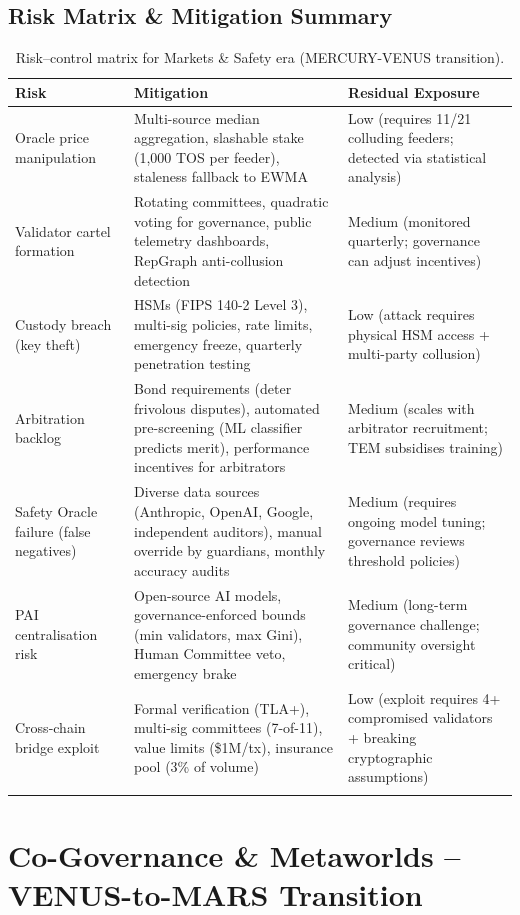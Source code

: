 \documentclass[11pt]{article}
\begin{document}
\subsection{Risk Matrix \& Mitigation Summary}
\begin{longtable}{@{}p{}p{}p{}@{}}
\toprule
\textbf{Risk} & \textbf{Mitigation} & \textbf{Residual Exposure} \\\midrule
Oracle price manipulation & Multi-source median aggregation, slashable stake (1,000 TOS per feeder), staleness fallback to EWMA & Low (requires 11/21 colluding feeders; detected via statistical analysis) \\
Validator cartel formation & Rotating committees, quadratic voting for governance, public telemetry dashboards, RepGraph anti-collusion detection & Medium (monitored quarterly; governance can adjust incentives) \\
Custody breach (key theft) & HSMs (FIPS 140-2 Level 3), multi-sig policies, rate limits, emergency freeze, quarterly penetration testing & Low (attack requires physical HSM access + multi-party collusion) \\
Arbitration backlog & Bond requirements (deter frivolous disputes), automated pre-screening (ML classifier predicts merit), performance incentives for arbitrators & Medium (scales with arbitrator recruitment; TEM subsidises training) \\
Safety Oracle failure (false negatives) & Diverse data sources (Anthropic, OpenAI, Google, independent auditors), manual override by guardians, monthly accuracy audits & Medium (requires ongoing model tuning; governance reviews threshold policies) \\
PAI centralisation risk & Open-source AI models, governance-enforced bounds (min validators, max Gini), Human Committee veto, emergency brake & Medium (long-term governance challenge; community oversight critical) \\
Cross-chain bridge exploit & Formal verification (TLA+), multi-sig committees (7-of-11), value limits (\$1M/tx), insurance pool (3\% of volume) & Low (exploit requires 4+ compromised validators + breaking cryptographic assumptions) \\\bottomrule
\caption{Risk--control matrix for Markets \& Safety era (MERCURY-VENUS transition).}
\label{tab:risk-markets-expanded}
\end{longtable}

\section{Co-Governance \& Metaworlds -- VENUS-to-MARS Transition}
\end{document}
